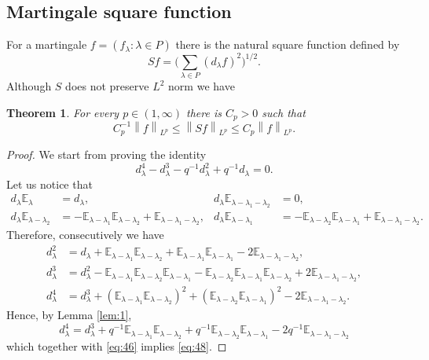 \documentclass[a4paper]{amsart}
\newcommand{\norm}[1]{{\left\lVert #1 \right\rVert}}
\newcommand{\seq}[2]{\left({#1}: {#2}\right)}
\newcommand{\EE}{\mathbb{E}}
\theoremstyle{plain}
\newtheorem{theorem}{Theorem}
\theoremstyle{definition}
\theoremstyle{remark}
\numberwithin{equation}{section}
\theoremstyle{plain}
\begin{document}
\subsection{Martingale square function}
For a martingale $f = \seq{f_\lambda}{\lambda \in P}$ there is the natural square function
defined by
$$
S f = \Big(\sum_{\lambda \in P} (d_\lambda f)^2 \Big)^{1/2}.
$$
Although $S$ does not preserve $L^2$ norm we have
\begin{theorem}
	\label{th:2}
	For every $p \in (1, \infty)$ there is $C_p > 0$ such that
	$$
	C_p^{-1} \norm{f}_{L^p} \leq \norm{S f}_{L^p} \leq C_p \norm{f}_{L^p}.
	$$
\end{theorem}
\begin{proof}
	We start from proving the identity
	\begin{equation}
		\label{eq:48}
		d_\lambda^4 - d_\lambda^3 - q^{-1} d_\lambda^2 + q^{-1} d_\lambda =0.
	\end{equation}
	Let us notice that
	\begin{align*}
		d_\lambda \EE_{\lambda} &= d_\lambda,
		&d_\lambda \EE_{\lambda-\lambda_1-\lambda_2} &= 0, \\
		d_\lambda \EE_{\lambda-\lambda_2} &= - \EE_{\lambda-\lambda_1} \EE_{\lambda-\lambda_2} 
		+ \EE_{\lambda-\lambda_1-\lambda_2},
		&d_\lambda \EE_{\lambda-\lambda_1} &= -\EE_{\lambda-\lambda_2} \EE_{\lambda-\lambda_1} 
		+\EE_{\lambda-\lambda_1 - \lambda_2}.
	\end{align*}
	Therefore, consecutively we have
	\begin{align}
		\label{eq:46}
		d_\lambda^2 &= d_\lambda + \EE_{\lambda-\lambda_1} \EE_{\lambda-\lambda_2} 
		+ \EE_{\lambda - \lambda_1} \EE_{\lambda - \lambda_1} - 2 \EE_{\lambda-\lambda_1-\lambda_2},\\
		\nonumber
		d_\lambda^3 &= d_\lambda^2 - \EE_{\lambda-\lambda_1} \EE_{\lambda-\lambda_2} 
		\EE_{\lambda - \lambda_1} - \EE_{\lambda-\lambda_2}\EE_{\lambda-\lambda_1}
		\EE_{\lambda- \lambda_2}
		+2\EE_{\lambda-\lambda_1-\lambda_2},\\
		\nonumber
		d_\lambda^4 &= d_\lambda^3 
		+ (\EE_{\lambda-\lambda_1} \EE_{\lambda - \lambda_2})^2 
		+ (\EE_{\lambda-\lambda_2} \EE_{\lambda - \lambda_1})^2 - 2\EE_{\lambda-\lambda_1-\lambda_2}.
	\end{align}
	Hence, by Lemma \ref{lem:1},
	\[
		d_\lambda^4 = d_\lambda^3 + q^{-1} \EE_{\lambda-\lambda_1} \EE_{\lambda - \lambda_2}
		+ q^{-1} \EE_{\lambda-\lambda_2} \EE_{\lambda-\lambda_1} - 2 q^{-1} \EE_{\lambda-\lambda_1-\lambda_2}
	\]
	which together with \eqref{eq:46} implies \eqref{eq:48}.


\end{proof}
\end{document}
